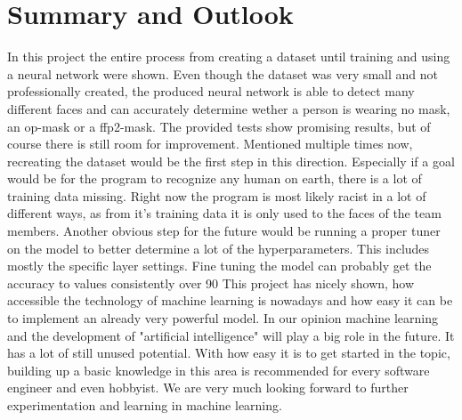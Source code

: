 \section{Summary and Outlook}

In this project the entire process from creating a dataset until training and
using a neural network were shown. Even though the dataset was very small and
not professionally created, the produced neural network is able to detect many
different faces and can accurately determine wether a person is wearing no mask,
an op-mask or a ffp2-mask.
\newline
The provided tests show promising results, but of course there is still room for
improvement. Mentioned multiple times now, recreating the dataset would be the
first step in this direction. Especially if a goal would be for the program to
recognize any human on earth, there is a lot of training data missing. Right now
the program is most likely racist in a lot of different ways, as from it's
training data it is only used to the faces of the team members.
\newline
Another obvious step for the future would be running a proper tuner on the model
to better determine a lot of the hyperparameters. This includes mostly the
specific layer settings. Fine tuning the model can probably get the accuracy to
values consistently over 90%
\newline
This project has nicely shown, how accessible the technology of machine learning
is nowadays and how easy it can be to implement an already very powerful model.
In our opinion machine learning and the development of "artificial intelligence"
will play a big role in the future. It has a lot of still unused potential.
With how easy it is to get started in the topic, building up a basic knowledge
in this area is recommended for every software engineer and even hobbyist.
\newline
We are very much looking forward to further experimentation and learning in
machine learning.